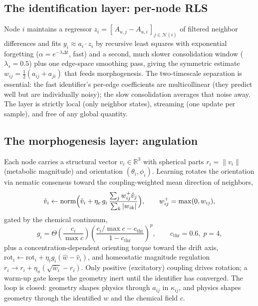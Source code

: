 \documentclass[11pt]{article}
\begin{document}
\subsection{The identification layer: per-node RLS}
Node $i$ maintains a regressor $z_i = [\,A_{u,j} - A_{u,i}\,]_{j \in \mathcal{N}(i)}$
of filtered neighbor differences and fits $y_i \approx a_i \cdot z_i$ by recursive least
squares with exponential forgetting ($\alpha = e^{-\lambda \Delta t}$, fast) and a
second, much slower consolidation window ($\lambda_s = 0.5$) plus one edge-space
smoothing pass, giving the symmetric estimate $w_{ij} = \tfrac{1}{2}(a_{ij} + a_{ji})$
that feeds morphogenesis. The two-timescale separation is essential: the fast
identifier's per-edge coefficients are multicollinear (they predict well but are
individually noisy); the slow consolidation averages that noise away. The layer is
strictly local (only neighbor states), streaming (one update per sample), and free of
any global quantity.

\subsection{The morphogenesis layer: angulation}
Each node carries a structural vector $v_i \in \mathbb{R}^3$ with spherical parts
$r_i = \|v_i\|$ (metabolic magnitude) and orientation $(\theta_i, \phi_i)$. Learning
rotates the orientation via nematic consensus toward the coupling-weighted mean
direction of neighbors,
\begin{equation}
\hat v_i \leftarrow \mathrm{norm}\Bigl(\hat v_i + \eta_e\, g_i\,
\frac{\sum_j w_{ij}^{+} \hat v_j}{\sum_k |w_{ik}|}\Bigr), \qquad
w_{ij}^{+} = \max(0, w_{ij}),
\end{equation}
gated by the chemical continuum,
\begin{equation}
g_i = \Theta\!\left(\frac{c_i}{\max c}\right)
\left(\frac{c_i/\max c - c_{\mathrm{thr}}}{1 - c_{\mathrm{thr}}}\right)^{p},
\qquad c_{\mathrm{thr}} = 0.6,\; p = 4,
\end{equation}
plus a concentration-dependent orienting torque toward the drift axis,
$\mathrm{rot}_i \leftarrow \mathrm{rot}_i + \eta_t g_i (\hat w - \hat v_i)$, and
homeostatic magnitude regulation $r_i \to r_i + \eta_n(\sqrt{\bar w_i} - r_i)$. Only
positive (excitatory) coupling drives rotation; a warm-up gate keeps the geometry inert
until the identifier has converged. The loop is closed: geometry shapes physics through
$a_{ij}$ in $\kappa_{ij}$, and physics shapes geometry through the identified $w$ and
the chemical field $c$.
\end{document}
